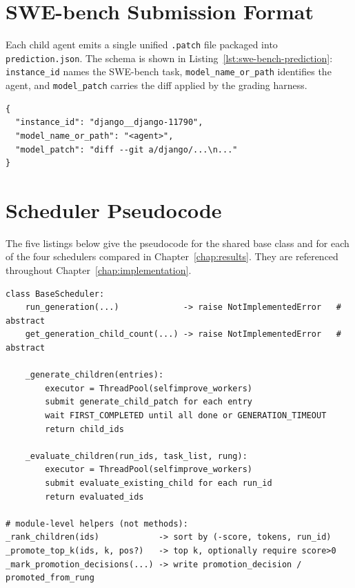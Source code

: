 \section{SWE-bench Submission Format}
\label{app:swe-bench-submission}

Each child agent emits a single unified \texttt{.patch} file packaged
into \texttt{prediction.json}. The schema is shown in
Listing~\ref{lst:swe-bench-prediction}: \texttt{instance\_id} names the
SWE-bench task, \texttt{model\_name\_or\_path} identifies the agent,
and \texttt{model\_patch} carries the diff applied by the grading
harness.

\begin{lstlisting}[basicstyle=\ttfamily\footnotesize,columns=fullflexible,caption={SWE-bench \texttt{prediction.json} schema.},label={lst:swe-bench-prediction}]
{
  "instance_id": "django__django-11790",
  "model_name_or_path": "<agent>",
  "model_patch": "diff --git a/django/...\n..."
}
\end{lstlisting}

\section{Scheduler Pseudocode}
\label{app:scheduler-pseudocode}

The five listings below give the pseudocode for the shared base class
and for each of the four schedulers compared in
Chapter~\ref{chap:results}. They are referenced throughout
Chapter~\ref{chap:implementation}.

\begin{lstlisting}[basicstyle=\ttfamily\footnotesize,columns=fullflexible,breaklines=true,caption={\texttt{BaseScheduler} contract and shared helpers.},label={lst:base-scheduler}]
class BaseScheduler:
    run_generation(...)             -> raise NotImplementedError   # abstract
    get_generation_child_count(...) -> raise NotImplementedError   # abstract

    _generate_children(entries):
        executor = ThreadPool(selfimprove_workers)
        submit generate_child_patch for each entry
        wait FIRST_COMPLETED until all done or GENERATION_TIMEOUT
        return child_ids

    _evaluate_children(run_ids, task_list, rung):
        executor = ThreadPool(selfimprove_workers)
        submit evaluate_existing_child for each run_id
        return evaluated_ids

# module-level helpers (not methods):
_rank_children(ids)            -> sort by (-score, tokens, run_id)
_promote_top_k(ids, k, pos?)   -> top k, optionally require score>0
_mark_promotion_decisions(...) -> write promotion_decision / promoted_from_rung
\end{lstlisting}

